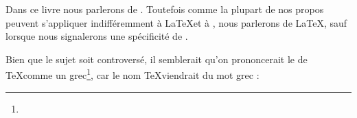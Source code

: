 Dans  ce livre nous parlerons de \XeLaTeX. Toutefois comme la plupart de nos propos peuvent s'appliquer indifféremment  à \LaTeX et à \XeLaTeX, nous parlerons de \LaTeX, sauf lorsque nous signalerons une spécificité de \XeLaTeX.
\begin{anedocte}
Bien que le sujet soit controversé, il semblerait qu'on prononcerait le   de \TeX comme un  grec\footnote{}, car le nom \TeX viendrait du mot grec  : 
\end{anedocte}